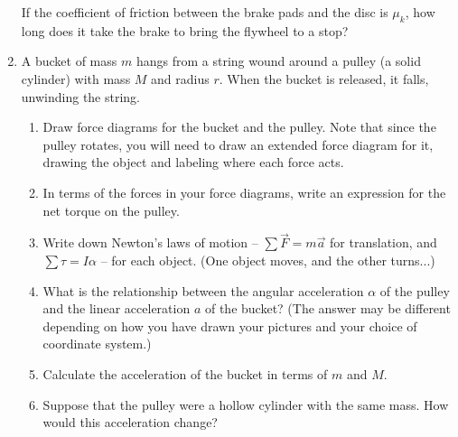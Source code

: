 \documentclass[12pt]{article}
\begin{document}
\begin{enumerate}
If the coefficient of friction between the brake pads and the disc is $\mu_k$, how long does it take the
brake to bring the flywheel to a stop?


\newpage

\item A bucket of mass $m$ hangs from a string wound around a pulley 
(a solid cylinder) with mass $M$ and radius $r$. When the bucket is
released, it falls, unwinding the string.

\begin{enumerate}

\item Draw force diagrams for the bucket and the pulley. Note that since the pulley rotates, you will need
to draw an extended force diagram for it, drawing the object and labeling where each force acts.

\vspace{3in}

\item In terms of the forces in your force diagrams, write an expression for the net torque on the pulley.

\vspace{1in}

\item Write down Newton's laws of motion -- $\sum \vec F = m \vec a$ for translation, and $\sum \tau = I \alpha$
-- for each object. (One object moves, and the other turns...)

\vspace{2in}


\newpage

\item What is the relationship between the angular acceleration $\alpha$ of the pulley and the linear acceleration
$a$ of the bucket? (The answer may be different depending on how you have drawn your pictures and your choice of
coordinate system.)

\vspace{1in}

\item Calculate the acceleration of the bucket in terms of $m$ and $M$.

\vspace{3in}

\item Suppose that the pulley were a hollow cylinder with the same mass. How would this acceleration change?

\newpage
\end{enumerate}


\end{enumerate}
\end{document}
